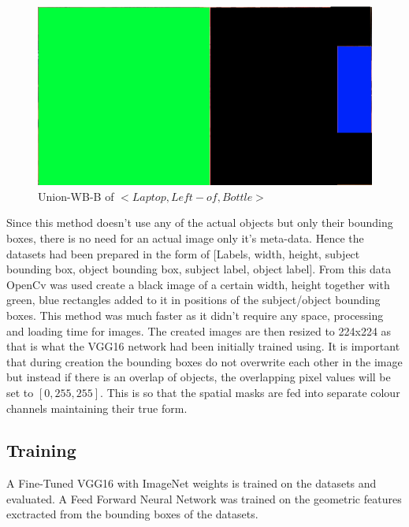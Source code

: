 \documentclass{csfyp}
\begin{document}
\begin{figure}[!htbp]
\centering
\includegraphics[scale=0.35]{UnionWBB.pdf}
\caption{Union-WB-B  of $<Laptop, Left-of , Bottle>$}
\end{figure}

Since this method doesn’t use any of the actual objects but only their bounding boxes, there is no need for an actual image only it’s meta-data. Hence the datasets had been prepared in the form of [Labels, width, height, subject bounding box, object bounding box, subject label, object label]. From this data OpenCv was used create a black image of a certain width, height together with green, blue rectangles added to it in positions of the subject/object bounding boxes. This method was much faster as it didn’t require any space, processing and loading time for images. The created images are then resized to 224x224 as that is what the VGG16 network had been initially trained using. It is important that during creation the bounding boxes do not overwrite each other in the image but instead if there is an overlap of objects, the overlapping pixel values will be set to $[0,255,255]$. This is so that the spatial masks are fed into separate colour channels maintaining their true form.


\subsection{Training}
A Fine-Tuned VGG16 with ImageNet weights is trained on the datasets and evaluated. A Feed Forward Neural Network was trained on the geometric features exctracted from the bounding boxes of the datasets.
\end{document}
